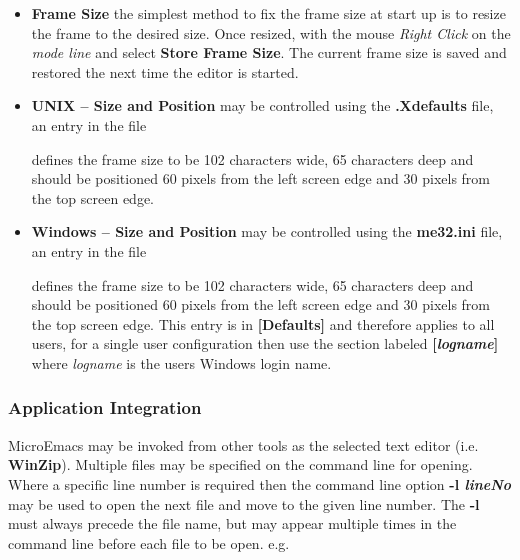 \documentclass[11pt,a4paper,pdftex]{article}
\begin{document}
\begin{itemize}
\begin{itemize}
      \item \textbf{Frame Size} the simplest method to fix the frame size at
      start up is to resize the frame to the desired size. Once resized, with
      the mouse \textit{Right Click} on the \textit{mode line} and select
      \textbf{Store Frame Size}. The current frame size is saved and restored
      the next time the editor is started.

      \item \textbf{UNIX -- Size and Position} may be controlled using the
      \textbf{.Xdefaults} file, an entry in the file


      defines the frame size to be 102 characters wide, 65 characters deep and
      should be positioned 60 pixels from the left screen edge and 30 pixels
      from the top screen edge.

      \item \textbf{Windows -- Size and Position} may be controlled using the
      \textbf{me32.ini} file, an entry in the file


      defines the frame size to be 102 characters wide, 65 characters deep and
      should be positioned 60 pixels from the left screen edge and 30 pixels
      from the top screen edge. This entry is in \textbf{[Defaults]} and
      therefore applies to all users, for a single user configuration then use
      the section labeled \textbf{[\textit{logname}]} where \textit{logname}
      is the users Windows login name.

    \end{itemize}

  \end{itemize}

\subsubsection{Application Integration}

  MicroEmacs may be invoked from other tools as the selected text editor (i.e.
  \textbf{WinZip}). Multiple files may be specified on the command line for
  opening. Where a specific line number is required then the command line
  option \textbf{-l \textit{lineNo}} may be used to open the next file and
  move to the given line number. The \textbf{-l} must always precede the file
  name, but may appear multiple times in the command line before  each file
  to be open. e.g.
\end{document}
